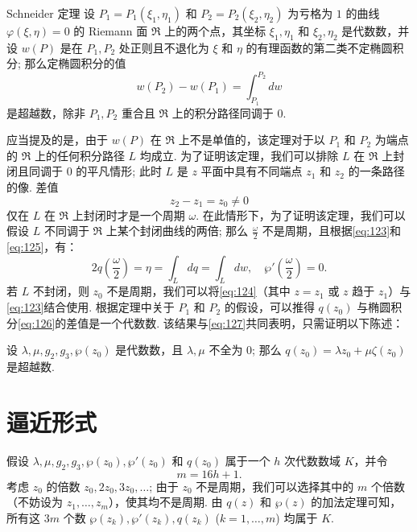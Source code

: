 \begin{mythm*}{Schneider 定理}
设 $P_1 = P_1(\xi_1, \eta_1)$ 和 $P_2 = P_2(\xi_2, \eta_2)$ 为亏格为 $1$ 的曲线 $\varphi(\xi, \eta) = 0$ 的 Riemann 面 $\mathfrak{R}$ 上的两个点，其坐标 $\xi_1, \eta_1$ 和 $\xi_2, \eta_2$ 是代数数，并设 $w(P)$ 是在 $P_1, P_2$ 处正则且不退化为 $\xi$ 和 $\eta$ 的有理函数的第二类不定椭圆积分; 那么定椭圆积分的值
\begin{equation}
w(P_2) - w(P_1) = \int_{P_1}^{P_2} dw \tag{126}\label{eq:126}
\end{equation}
是超越数，除非 $P_1, P_2$ 重合且 $\mathfrak{R}$ 上的积分路径同调于 $0$.
\end{mythm*}

应当提及的是，由于 $w(P)$ 在 $\mathfrak{R}$ 上不是单值的，该定理对于以 $P_1$ 和 $P_2$ 为端点的 $\mathfrak{R}$ 上的任何积分路径 $L$ 均成立. 为了证明该定理，我们可以排除 $L$ 在 $\mathfrak{R}$ 上封闭且同调于 $0$ 的平凡情形; 此时 $L$ 是 $z$ 平面中具有不同端点 $z_1$ 和 $z_2$ 的一条路径的像. 差值
\[
z_2 - z_1 = z_0 \neq 0
\]
仅在 $L$ 在 $\mathfrak{R}$ 上封闭时才是一个周期 $\omega$. 在此情形下，为了证明该定理，我们可以假设 $L$ 不同调于 $\mathfrak{R}$ 上某个封闭曲线的两倍; 那么 $\frac{\omega}{2}$ 不是周期，且根据\eqref{eq:123}和\eqref{eq:125}，有：
\begin{equation}
2q\left(\frac{\omega}{2}\right) = \eta = \int_{L} dq = \int_{L} dw, \quad \wp'\left(\frac{\omega}{2}\right) = 0. \tag{127}\label{eq:127}
\end{equation}
若 $L$ 不封闭，则 $z_0$ 不是周期，我们可以将\eqref{eq:124}（其中 $z = z_1$ 或 $z$ 趋于 $z_1$）与\eqref{eq:123}结合使用. 根据定理中关于 $P_1$ 和 $P_2$ 的假设，可以推得 $q(z_0)$ 与椭圆积分\eqref{eq:126}的差值是一个代数数. 该结果与\eqref{eq:127}共同表明，只需证明以下陈述：

设 $\lambda, \mu, g_2, g_3, \wp(z_0)$ 是代数数，且 $\lambda, \mu$ 不全为 $0$; 那么 $q(z_0) = \lambda z_0 + \mu \zeta(z_0)$ 是超越数.

\section{逼近形式}\label{sec:4.3}

假设 $\lambda, \mu, g_2, g_3, \wp(z_0), \wp'(z_0)$ 和 $q(z_0)$ 属于一个 $h$ 次代数数域 $K$，并令
\[
m = 16h + 1.
\]
考虑 $z_0$ 的倍数 $z_0, 2z_0, 3z_0, \dots$; 由于 $z_0$ 不是周期，我们可以选择其中的 $m$ 个倍数（不妨设为 $z_1, \dots, z_m$），使其均不是周期. 由 $q(z)$ 和 $\wp(z)$ 的加法定理可知，所有这 $3m$ 个数 $\wp(z_k), \wp'(z_k), q(z_k)$ ($k = 1, \dots, m$) 均属于 $K$.

